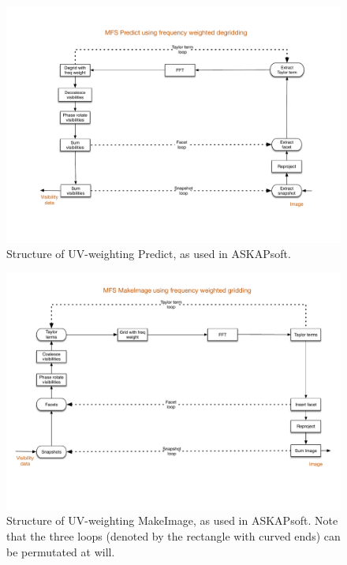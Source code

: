 \documentclass[11pt,a4paper]{article}
\begin{document}
\begin{figure}[htb]
  \centering
  \includegraphics[width=\textwidth]{./MSMFS_Predict_UV.pdf}
  \caption{Structure of UV-weighting Predict, as used in ASKAPsoft. }
  \label{fig:predictuv}
\end{figure}

\begin{figure}[htb]
  \centering
  \includegraphics[width=\textwidth]{./MSMFS_MakeImage_UV.pdf}
  \caption{Structure of UV-weighting MakeImage, as used in ASKAPsoft. Note that the three loops (denoted by the rectangle with curved ends) can be permutated at will.}
  \label{fig:predictimage}
\end{figure}
\end{document}
